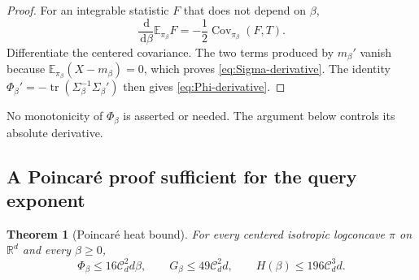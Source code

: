 \documentclass[11pt]{article}
\newtheorem{theorem}{Theorem}[section]
\theoremstyle{remark}
\newcommand{\R}{\mathbb R}
\newcommand{\E}{\mathbb E}
\newcommand{\1}{\bm 1}
\newcommand{\Cov}{\operatorname{Cov}}
\newcommand{\tr}{\operatorname{tr}}
\newcommand{\dd}{\,\mathrm d}
\begin{document}
\begin{proof}
For an integrable statistic $F$ that does not depend on $\beta$,
\[
  \frac{\dd}{\dd\beta}\E_{\pi_\beta}F
  =-\frac12\Cov_{\pi_\beta}(F,T).
\]
Differentiate the centered covariance.  The two terms produced by
$m_\beta'$ vanish because
$\E_{\pi_\beta}(X-m_\beta)=0$, which proves
\eqref{eq:Sigma-derivative}.  The identity
$\Phi_\beta'=-\tr(\Sigma_\beta^{-1}\Sigma_\beta')$ then gives
\eqref{eq:Phi-derivative}.
\end{proof}

No monotonicity of $\Phi_\beta$ is asserted or needed.  The argument
below controls its absolute derivative.

\subsection{A Poincar\'e proof sufficient for the query exponent}

\begin{theorem}[Poincar\'e heat bound]
\label{thm:poincare-heat}
For every centered isotropic logconcave $\pi$ on $\R^d$ and every
$\beta\geq0$,
\begin{equation}\label{eq:poincare-heat-result}
  \Phi_\beta\leq16\mathcal C_d^2d\beta,
  \qquad
  G_\beta\leq49\mathcal C_d^2d,
  \qquad
  H(\beta)\leq196\mathcal C_d^3d.
\end{equation}
\end{theorem}
\end{document}
